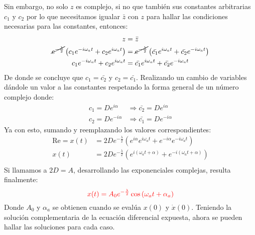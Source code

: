 \begin{multicols}{2}
Sin embargo, no solo $z$ es complejo, si no que también sus constantes arbitrarias $c_{1}$ y $c_{2}$ por lo que necesitamos igualar $\bar{z}$ con $z$ para hallar las condiciones necesarias para las constantes, entonces:
\begin{align*}
    z &= \bar{z}\\
    \cancel{e^{-\frac{\lambda}{2}}} \left(c_{1} e^{-i\omega_a t} + c_{2} e^{i\omega_a t}\right) &= \cancel{e^{-\frac{\lambda}{2}}} \left(\bar{c_{1}} e^{i\omega_a t} + \bar{c_{2}} e^{-i\omega_a t}\right)\\
    c_{1} e^{-i\omega_a t} + c_{2} e^{i\omega_a t} &= \bar{c_{1}} e^{i\omega_a t} + \bar{c_{2}} e^{-i\omega_a t}
\end{align*}
De donde se concluye que $c_{1} = \bar{c_{2}}$ y $c_{2} = \bar{c_{1}}$. Realizando un cambio de variables dándole un valor a las constantes respetando la forma general de un número complejo donde:
\begin{align*}
    c_{1} = D e^{i\alpha} &\Rightarrow \bar{c_{2}} = D e^{i\alpha}\\
    c_{2} = D e^{-i\alpha} &\Rightarrow \bar{c_{1}} = D e^{-i\alpha}
\end{align*}
Ya con esto, sumando y reemplazando los valores correspondientes:
\begin{align*}
    \mathrm{Re} = x(t) &= 2De^{-\frac{\lambda}{2}} \left(e^{i\alpha}e^{i\omega_at} + e^{-i\alpha}e^{-i\omega_at}\right)\\
    x(t) &= 2De^{-\frac{\lambda}{2}} \left(e^{i\left(\omega_at + \alpha\right)} + e^{-i\left(\omega_at + \alpha\right)}\right)\\
\end{align*}
Si llamamos a $2D = A$, desarrollando las exponenciales complejas, resulta finalmente:
\begin{equation}
    \textcolor{rojo}{x(t) = A_0e^{-\frac{\lambda}{2}} \cos\left(\omega_a t + \alpha_a\right)} \label{pro5:res3}
\end{equation}
Donde $A_0$ y $\alpha_a$ se obtienen cuando se evalúa $x(0)$ y $\dot{x}(0)$. Teniendo la solución complementaria de la ecuación diferencial expuesta, ahora se pueden hallar las soluciones para cada caso.


\end{multicols}
